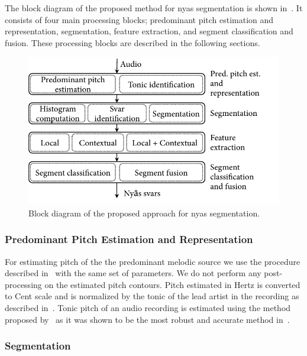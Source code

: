 {The block diagram of the proposed method for \gls{nyas} segmentation is shown in~. It consists of four main processing blocks; predominant pitch estimation and representation, segmentation, feature extraction, and segment classification and fusion. These processing blocks are described in the following sections.

\begin{figure}
	\begin{center}
		\includegraphics[width=\figSizeEightyFive]{ch05_preprocessing/figures/BlockDiagramNyasSegmentation.pdf}
	\end{center}
	\caption{Block diagram of the proposed approach for \gls{nyas} segmentation.}
	\label{fig:bd_nyas_segmentation}
\end{figure}

\subsubsection{Predominant Pitch Estimation and Representation}

For estimating pitch of the the predominant melodic source we use the procedure described in~ with the same set of parameters. We do not perform any post-processing on the estimated pitch contours. Pitch estimated in Hertz is converted to Cent scale and is normalized by the tonic of the lead artist in the recording as described in~. Tonic pitch of an audio recording is estimated using the method proposed by~\cite{salamon2012multipitch} as it was shown to be the most robust and accurate method in~. 


\subsubsection{Segmentation}
\label{sec:nyas_svara_segmentation_method}

}

